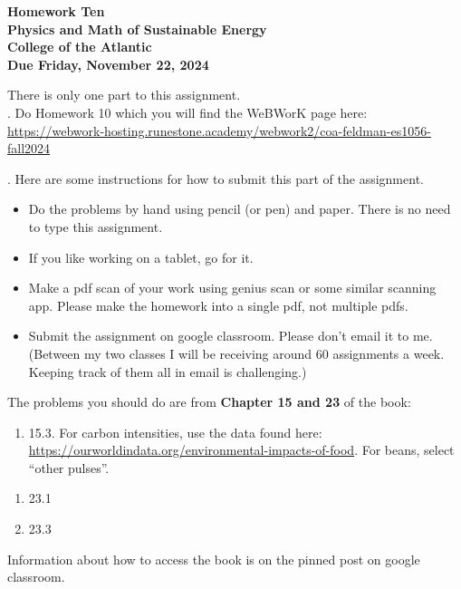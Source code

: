 \documentclass[12pt]{article}
\begin{document}
\pagestyle{empty}
 
\begin{center}
{\LARGE {\bf Homework Ten}}\\
\bigskip
{\Large {\bf Physics and Math of Sustainable Energy}}\\
\bigskip
{\Large {\bf College of the Atlantic}}\\
\bigskip
{ {\bf Due Friday, November 22, 2024}}\\ 
\end{center}
\medskip


\noindent There is only one part to this assignment.\\

. Do Homework 10 which you will find
the WeBWorK page here:  
\url{https://webwork-hosting.runestone.academy/webwork2/coa-feldman-es1056-fall2024}


.  Here are some
instructions for how to submit this part of the assignment.
\begin{itemize}
\item Do the problems by hand using pencil (or pen) and paper.
  There is no need to type this assignment.
\item If you like working on a tablet, go for it. 
\item Make a pdf scan of your work using genius scan or some
  similar scanning app.  Please make the homework into a single
  pdf, not multiple pdfs.
\item Submit the assignment on google classroom.  Please don't
  email it to me.  (Between my two classes I will be receiving
  around 60 assignments a week.  Keeping track of them all in email 
  is challenging.)\\
\end{itemize}



\noindent The problems you should do are from {\bf Chapter 15 and 23} 
of the book:  \\  

\begin{enumerate}
  \setlength{\itemsep}{-1mm}
\item 15.3. For carbon intensities, use the data found here:
  \url{https://ourworldindata.org/environmental-impacts-of-food}. For
  beans, select ``other pulses''. 
\end{enumerate}


\begin{enumerate}
  \setlength{\itemsep}{-1mm}
\item 23.1
\item 23.3
\end{enumerate}



\noindent Information about how to access the book is on the
pinned post on google classroom. 
\end{document}
